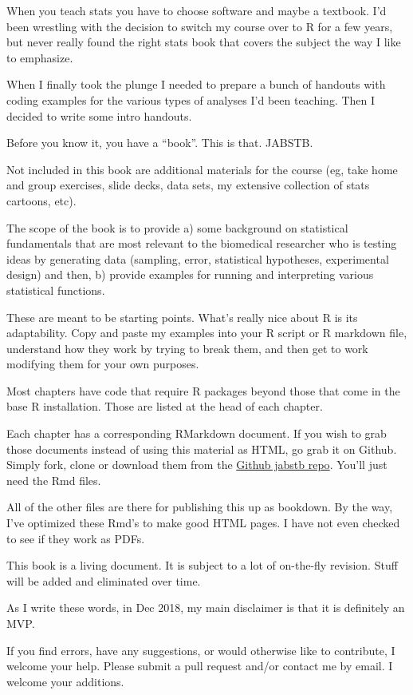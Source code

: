 \documentclass[]{book}
\begin{document}
When you teach stats you have to choose software and maybe a textbook. I'd been wrestling with the decision to switch my course over to R for a few years, but never really found the right stats book that covers the subject the way I like to emphasize.

When I finally took the plunge I needed to prepare a bunch of handouts with coding examples for the various types of analyses I'd been teaching. Then I decided to write some intro handouts.

Before you know it, you have a ``book''. This is that. JABSTB.

Not included in this book are additional materials for the course (eg, take home and group exercises, slide decks, data sets, my extensive collection of stats cartoons, etc).

The scope of the book is to provide a) some background on statistical fundamentals that are most relevant to the biomedical researcher who is testing ideas by generating data (sampling, error, statistical hypotheses, experimental design) and then, b) provide examples for running and interpreting various statistical functions.

These are meant to be starting points. What's really nice about R is its adaptability. Copy and paste my examples into your R script or R markdown file, understand how they work by trying to break them, and then get to work modifying them for your own purposes.

Most chapters have code that require R packages beyond those that come in the base R installation. Those are listed at the head of each chapter.

Each chapter has a corresponding RMarkdown document. If you wish to grab those documents instead of using this material as HTML, go grab it on Github. Simply fork, clone or download them from the \href{https://github.com/TJMurphy/jabstb}{Github jabstb repo}. You'll just need the Rmd files.

All of the other files are there for publishing this up as bookdown. By the way, I've optimized these Rmd's to make good HTML pages. I have not even checked to see if they work as PDFs.

This book is a living document. It is subject to a lot of on-the-fly revision. Stuff will be added and eliminated over time.

As I write these words, in Dec 2018, my main disclaimer is that it is definitely an MVP.

If you find errors, have any suggestions, or would otherwise like to contribute, I welcome your help. Please submit a pull request and/or contact me by email. I welcome your additions.
\end{document}
